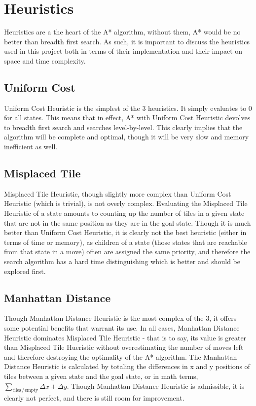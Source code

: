\documentclass{article}
\begin{document}
\section{Heuristics}
Heuristics are a the heart of the A* algorithm, without them, A* would be no better than breadth first search. As such, it is important to discuss the heuristics used in this project both in terms of their implementation and their impact on space and time complexity.
\subsection{Uniform Cost}
Uniform Cost Heuristic is the simplest of the 3 heuristics. It simply evaluates to 0 for all states. This means that in effect, A* with Uniform Cost Heuristic devolves to breadth first search and searches level-by-level. This clearly implies that the algorithm will be complete and optimal, though it will be very slow and memory inefficient as well.
\subsection{Misplaced Tile}
Misplaced Tile Heuristic, though slightly more complex than Uniform Cost Heuristic (which is trivial), is not overly complex. Evaluating the Misplaced Tile Heuristic of a state amounts to counting up the number of tiles in a given state that are not in the same position as they are in the goal state. Though it is much better than Uniform Cost Heuristic, it is clearly not the best heuristic (either in terms of time or memory), as children of a state (those states that are reachable from that state in a move) often are assigned the same priority, and therefore the search algorithm has a hard time distinguishing which is better and should be explored first.
\subsection{Manhattan Distance}
Though Manhattan Distance Heuristic is the most complex of the 3, it offers some potential benefits that warrant its use. In all cases, Manhattan Distance Heuristic dominates Misplaced Tile Heuristic - that is to say, its value is greater than Misplaced Tile Hueristic without overestimating the number of moves left and therefore destroying the optimality of the A* algorithm. The Manhattan Distance Heuristic is calculated by totaling the differences in x and y positions of tiles between a given state and the goal state, or in math terms, $\sum_{\text{tiles}\neq\text{empty}}\Delta x + \Delta y$. Though Manhattan Distance Heuristic is admissible, it is clearly not perfect, and there is still room for improvement.
\end{document}
